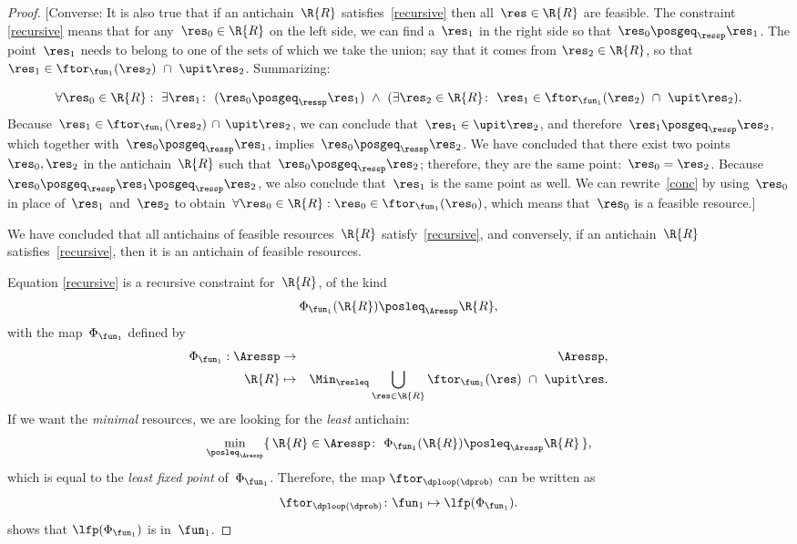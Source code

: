 \begin{proof}
{[}Converse: It is also true that if an antichain~$\R{R}$ satisfies~\eqref{recursive}
then all~$\res\in\R{R}$ are feasible. The constraint \eqref{recursive}
means that for any~$\res_{0}\in\R{R}$ on the left side, we can find
a~$\res_{1}$ in the right side so that~$\res_{0}\posgeq_{\ressp}\res_{1}$.
The point~$\res_{1}$ needs to belong to one of the sets of which
we take the union; say that it comes from $\res_{2}\in\R{R}$, so
that $\res_{1}\in\ftor_{\fun_{1}}(\res_{2})\ \cap\ \upit\res_{2}$.
Summarizing:

{\footnotesize{}
\begin{equation}
\forall\res_{0}\in\R{R}:\ \exists\res_{1}\colon\ (\res_{0}\posgeq_{\ressp}\res_{1})\ \wedge\ (\exists\res_{2}\in\R{R}\colon\ \res_{1}\in\ftor_{\fun_{1}}(\res_{2})\ \cap\ \upit\res_{2}).\label{eq:conc}
\end{equation}
}Because~$\res_{1}\in\ftor_{\fun_{1}}(\res_{2})\,\cap\,\upit\res_{2}$,
we can conclude that~$\res_{1}\in\upit\res_{2}$, and therefore~$\res_{1}\posgeq_{\ressp}\res_{2}$,
which together with~$\res_{0}\posgeq_{\ressp}\res_{1}$, implies~$\res_{0}\posgeq_{\ressp}\res_{2}$.
We have concluded that there exist two points~$\res_{0},\res_{2}$
in the antichain~$\R{R}$ such that~$\res_{0}\posgeq_{\ressp}\res_{2}$;
therefore, they are the same point:~$\res_{0}=\res_{2}$. Because~$\res_{0}\posgeq_{\ressp}\res_{1}\posgeq_{\ressp}\res_{2}$,
we also conclude that~$\res_{1}$ is the same point as well. We can
rewrite~\eqref{conc} by using~$\res_{0}$ in place of~$\res_{1}$
and~$\res_{2}$ to obtain~$\forall\res_{0}\in\R{R}:\res_{0}\in\ftor_{\fun_{1}}(\res_{0})$,
which means that~$\res_{0}$ is a feasible resource.{]}

We have concluded that all antichains of feasible resources~$\R{R}$
satisfy~\eqref{recursive}, and conversely, if an antichain~$\R{R}$
satisfies~\eqref{recursive}, then it is an antichain of feasible
resources. 

Equation \eqref{recursive} is a recursive constraint for~$\R{R}$,
of the kind 
\[
\Phi_{\fun_{1}}(\R{R})\posleq_{\Aressp}\R{R},
\]
with the map~$\Phi_{\fun_{1}}$ defined by
\begin{eqnarray}
\Phi_{\fun_{1}}:\Aressp & \rightarrow & \Aressp,\label{eq:bigphi}\\
\R{R} & \mapsto & \Min_{\resleq}\bigcup_{\res\in\R{R}}\ftor_{\fun_{1}}(\res)\ \cap\ \upit\res.\nonumber 
\end{eqnarray}
If we want the \emph{minimal} resources, we are looking for the \emph{least}
antichain: 
\[
\min_{\posleq_{\Aressp}}\{\,\R{R}\in\Aressp\colon\ \Phi_{\fun_{1}}(\R{R})\posleq_{\Aressp}\R{R}\,\},
\]
which is equal to the \emph{least fixed point }of~$\Phi_{\fun_{1}}$.
Therefore, the map $\ftor_{\dploop(\dprob)}$ can be written as
\begin{equation}
\ftor_{\dploop(\dprob)}\colon\fun_{1}\mapsto\lfp(\Phi_{\fun_{1}}).\label{eq:loop_fixpoint}
\end{equation}
 shows that $\lfp(\Phi_{\fun_{1}})$ is \scottcontinuous
in~$\fun_{1}$. 
\end{proof}

